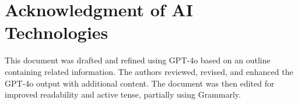 \documentclass[a4paper,12pt]{article}
\begin{document}
\section{Acknowledgment of AI Technologies}
	This document was drafted and refined using GPT-4o based on an outline containing related information. The authors reviewed, revised, and enhanced the GPT-4o output with additional content. The document was then edited for improved readability and active tense, partially using Grammarly.
	
\end{document}
